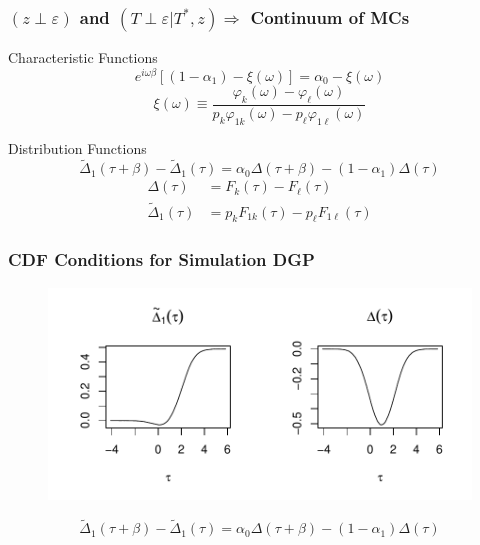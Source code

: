 \documentclass{beamer}
\begin{document}
\begin{frame}
  \frametitle{$(z \perp \varepsilon)$ and $(T\perp \varepsilon|T^*,z) \Rightarrow$ Continuum of MCs}

  \begin{block}{Characteristic Functions}
    \vspace{-1em}
\[
  e^{i\omega\beta}\left[(1 - \alpha_1) - \xi(\omega)\right] =  \alpha_0 - \xi(\omega) 
\]
\small
\[
  \xi(\omega) \equiv \frac{\varphi_k(\omega) - \varphi_\ell(\omega)}{p_k \varphi_{1k}(\omega) - p_\ell\varphi_{1\ell}(\omega)}
\]
\end{block}
\normalsize
  \begin{block}{Distribution Functions}
    \vspace{-1em}
\[
    \widetilde{\Delta}_1(\tau+\beta) - \widetilde{\Delta}_1(\tau) = \alpha_0 \Delta(\tau + \beta) - (1 - \alpha_1) \Delta(\tau)
\]
\small
\begin{align*}
  \Delta(\tau) &= F_k(\tau) - F_\ell(\tau)\\
  \widetilde{\Delta}_1(\tau) &= p_k F_{1k}(\tau) - p_\ell F_{1\ell}(\tau)
\end{align*}

  \end{block}

  \normalsize
\end{frame}
\begin{frame}
  \frametitle{CDF Conditions for Simulation DGP}
  \begin{figure}[h]
    \centering
    \includegraphics[width=\textwidth]{Delta_sim}
  \end{figure}
\[
    \widetilde{\Delta}_1(\tau+\beta) - \widetilde{\Delta}_1(\tau) = \alpha_0 \Delta(\tau + \beta) - (1 - \alpha_1) \Delta(\tau)
\]
\end{frame}
\end{document}
